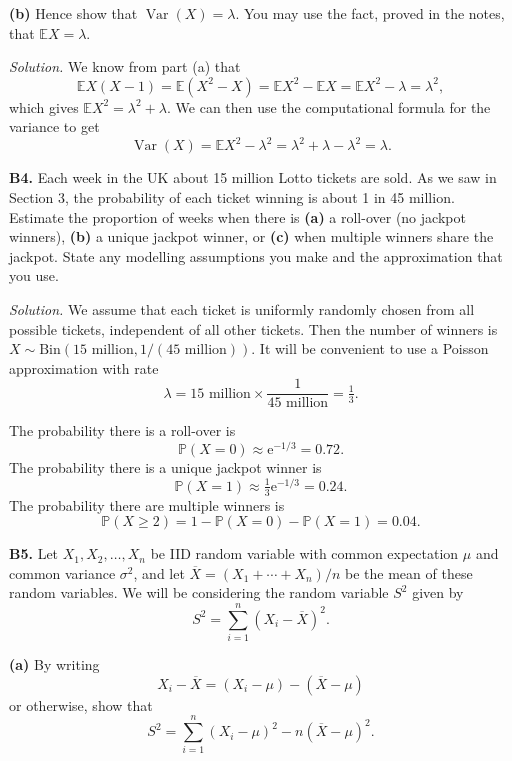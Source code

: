 \documentclass[
  a4paper,
]{book}
\theoremstyle{definition}
\theoremstyle{definition}
\theoremstyle{definition}
\theoremstyle{definition}
\theoremstyle{remark}
\begin{document}
\textbf{(b)} Hence show that \(\operatorname{Var}(X) = \lambda\). You may use the fact, proved in the notes, that \(\mathbb EX = \lambda\).

\begin{myanswers}
\emph{Solution.}
We know from part (a) that
\[ \mathbb EX(X-1) = \mathbb E(X^2 - X) = \mathbb EX^2 - \mathbb EX = \mathbb EX^2 - \lambda = \lambda^2 ,\]
which gives \(\mathbb EX^2 = \lambda^2 + \lambda\). We can then use the computational formula for the variance to get
\[ \operatorname{Var}(X) = \mathbb EX^2 - \lambda^2 = \lambda^2 + \lambda - \lambda^2 = \lambda .\]

\end{myanswers}

\textbf{B4.} Each week in the UK about 15 million Lotto tickets are sold. As we saw in Section 3, the probability of each ticket winning is about 1 in 45 million. Estimate the proportion of weeks when there is \textbf{(a)} a roll-over (no jackpot winners), \textbf{(b)} a unique jackpot winner, or \textbf{(c)} when multiple winners share the jackpot. State any modelling assumptions you make and the approximation that you use.

\begin{myanswers}
\emph{Solution.}
We assume that each ticket is uniformly randomly chosen from all possible tickets, independent of all other tickets. Then the number of winners is \(X \sim \text{Bin}(15 \text{ million}, 1/(45 \text{ million}))\).
It will be convenient to use a Poisson approximation with rate
\[ \lambda = 15 \text{ million} \times \frac{1}{45 \text{ million}} = \tfrac13 .  \]

The probability there is a roll-over is
\[ \mathbb P(X = 0) \approx \mathrm e^{-1/3} = 0.72 . \]
The probability there is a unique jackpot winner is
\[ \mathbb P(X = 1) \approx \tfrac13 \mathrm e^{-1/3} = 0.24 . \]
The probability there are multiple winners is
\[ \mathbb P(X \geq 2) = 1 - \mathbb P(X = 0) - \mathbb P(X = 1) = 0.04  . \]

\end{myanswers}

\textbf{B5.} Let \(X_1, X_2, \dots, X_n\) be IID random variable with common expectation \(\mu\) and common variance \(\sigma^2\), and let \(\overline X = (X_1 + \cdots + X_n)/n\) be the mean of these random variables. We will be considering the random variable \(S^2\) given by
\[ S^2 = \sum_{i=1}^n (X_i - \overline X)^2 . \]

\textbf{(a)} By writing
\[ X_i - \overline X = (X_i - \mu) - (\overline X - \mu)  \]
or otherwise, show that
\[ S^2 = \sum_{i=1}^n (X_i - \mu)^2 - n(\overline X - \mu)^2 . \]
\end{document}
